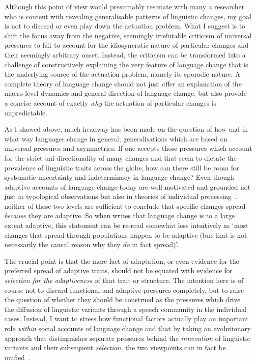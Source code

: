 Although this point of view would presumably resonate with many a researcher who is content with revealing generalisable patterns of linguistic changes, my goal is not to discard or even play down the actuation problem. 
What I suggest is to shift the focus away from the negative, seemingly irrefutable criticism of universal pressures to fail to account for the idiosyncratic nature of particular changes and their seemingly arbitrary onset. Instead, the criticism can be transformed into a challenge of constructively explaining the very feature of language change that is the underlying source of the actuation problem, namely its sporadic nature.
A complete theory of language change should not just offer an explanation of the macro-level dynamics and general direction of language change, but also provide a concise account of exactly \emph{why} the actuation of particular changes is unpredictable. %

As I showed above, much headway has been made on the question of how and in what way languages change in general, generalisations which are based on universal pressures and asymmetries. If one accepts those pressures which account for the strict uni-directionality of many changes and that seem to dictate the prevalence of linguistic traits across the globe, how can there still be room for systematic uncertainty and indeterminacy in language change?
Even though adaptive accounts of language change today are well-motivated and grounded not just in typological observations but also in theories of individual processing~\citep{Kirby1999,Jaeger2010}, neither of these two levels are sufficient to conclude that specific changes spread \emph{because} they are adaptive. So when \citet{Wichmann2015} writes that language change is to a large extent adaptive, this statement can be re-read somewhat less intuitively as `most changes that spread through populations happen to be adaptive (but that is not necessarily the causal reason why they \emph{do} in fact spread)'.

The crucial point is that the mere fact of adaptation, or even evidence for the preferred spread of adaptive traits, should not be equated with evidence for \emph{selection for the adaptiveness} of that trait or structure. %
The intention here is of course not to discard functional and adaptive pressures completely, but to raise the question of whether they should be construed as the pressures which drive the diffusion of linguistic variants through a speech community in the individual cases.
Instead, I want to stress how functional factors actually play an important role \emph{within} social accounts of language change and that by taking an evolutionary approach that distinguishes separate pressures behind the \emph{innovation} of linguistic variants and their subsequent \emph{selection}, the two viewpoints can in fact be unified~\citep{Croft2000,Croft2006}.

